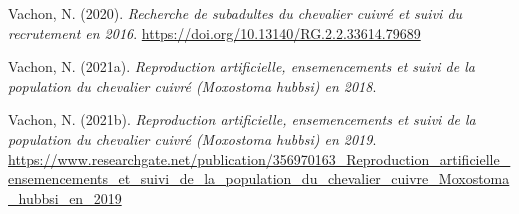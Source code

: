\documentclass[9pt,twocolumn,twoside,]{pnas-new}
\newlength{\cslhangindent}
\newenvironment{CSLReferences}[2] %
 {\begin{list}{}{%
  \setlength{\itemindent}{0pt}
  \setlength{\leftmargin}{0pt}
  \setlength{\parsep}{0pt}
  \ifodd #1
   \setlength{\leftmargin}{\cslhangindent}
   \setlength{\itemindent}{-1\cslhangindent}
  \fi
  \setlength{\itemsep}{#2\baselineskip}}}
 {\end{list}}
\begin{document}
\begin{CSLReferences}{1}{0}
Vachon, N. (2020). \emph{Recherche de subadultes du chevalier cuivré et
suivi du recrutement en 2016}.
\url{https://doi.org/10.13140/RG.2.2.33614.79689}

Vachon, N. (2021a). \emph{Reproduction artificielle, ensemencements et
suivi de la population du chevalier cuivré (\emph{{Moxostoma} hubbsi})
en 2018}.

Vachon, N. (2021b). \emph{Reproduction artificielle, ensemencements et
suivi de la population du chevalier cuivré (\emph{{Moxostoma} hubbsi})
en 2019}.
\url{https://www.researchgate.net/publication/356970163_Reproduction_artificielle_ensemencements_et_suivi_de_la_population_du_chevalier_cuivre_Moxostoma_hubbsi_en_2019}

\end{CSLReferences}



% 
\end{document}
